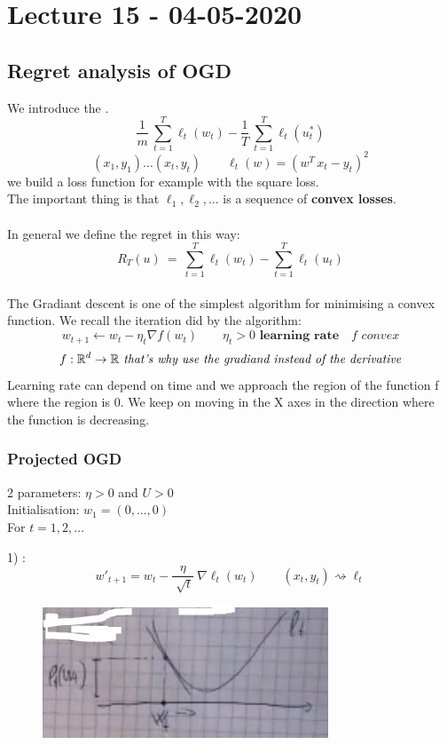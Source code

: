 \documentclass[../main.tex]{subfiles}
\begin{document}
\chapter{Lecture 15 - 04-05-2020}
 
 \section{Regret analysis of OGD}
 We introduce the .
 \\
 $$
 \frac{1}{m} \ \sum_{t=1}^{T} \ell_t(w_t) - \frac{1}{T} \ \sum_{t=1}^{T} \ell_t(u^*_t) 
 $$
$$
(x_1,y_1) ...(x_t,y_t) \qquad \ell_t(w) = \left( w^T \, x_t - y_t\right)^2
$$
we build a loss function for example with the square loss.
\\
The important thing is that $\ell_1 , \ell_2, ...$ is a sequence of \textbf{convex losses}.
\\\\
In general we define the regret in this way:
$$
 R_T(u) \ =  \ \sum_{t=1}^{T} \ell_t(w_t) -  \sum_{t=1}^{T} \ell_t(u_t) 
$$\\
The Gradiant descent is one of the simplest algorithm for minimising a convex function. We recall the iteration did by the algorithm:
$$
w_{t+1} \leftarrow w_t - \eta_t \nabla f(w_t) \qquad \eta_t > 0 \textbf{  learning rate} \quad \textit{f convex} 
$$
$$
f: \mathbb{R}^d \rightarrow \mathbb{R} \textit{ that's why use the gradiand instead of the derivative}
$$
Learning rate can depend on time and we approach the region of the function f where the region is 0. We keep on moving in the X axes in the direction where the function is decreasing.
\newpage
\subsection{Projected OGD}

2 parameters: $\eta > 0$ and $U > 0$
\\
Initialisation: $ w_1 = (0,...,0)$
\\
For $t = 1,2,...$

1) : 
$$w'_{t+1} = w_t - \frac{\eta}{\sqrt[]{t}} \ \nabla \ell_t(w_t) \qquad (x_t, y_t) \rightsquigarrow \ell_t
$$
\begin{figure}[h]
    \centering
    \includegraphics[width=0.3\linewidth]{../img/lez15-img1.JPG}
    \caption{}
\end{figure}\\
\end{document}

